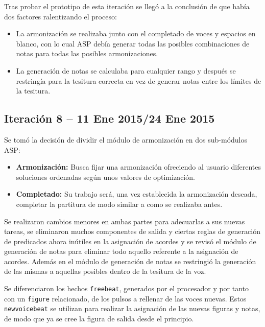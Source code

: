 Tras probar el prototipo de esta iteración se llegó a la conclusión de que había dos factores ralentizando el proceso:
\begin{itemize}
	\item La armonización se realizaba junto con el completado de voces y espacios en blanco, con lo cual ASP debía generar todas las posibles combinaciones de notas para todas las posibles armonizaciones.
	\item La generación de notas se calculaba para cualquier rango y después se restringía para la tesitura correcta en vez de generar notas entre los límites de la tesitura. 
\end{itemize}

\subsection{Iteración 8  -- 11 Ene 2015/24 Ene 2015}
\label{subsec:eighth_iteration}
Se tomó la decisión de dividir el módulo de armonización en dos sub-módulos ASP:
\begin{itemize}
	\item \textbf{Armonización:} Busca fijar una armonización ofreciendo al usuario diferentes soluciones ordenadas según unos valores de optimización.
	\item \textbf{Completado:} Su trabajo será, una vez establecida la armonización deseada, completar la partitura de modo similar a como se realizaba antes.
\end{itemize}

Se realizaron cambios menores en ambas partes para adecuarlas a sus nuevas tareas, se eliminaron muchos componentes de salida y ciertas reglas de generación de predicados ahora inútiles en la asignación de acordes y se revisó el módulo de generación de notas para eliminar todo aquello referente a la asignación de acordes. Además en el módulo de generación de notas se restringió la generación de las mismas a aquellas posibles dentro de la tesitura de la voz.

Se diferenciaron los hechos \texttt{freebeat}, generados por el procesador y por tanto con un \texttt{figure} relacionado, de los pulsos a rellenar de las voces nuevas. Estos \texttt{newvoicebeat} se utilizan para realizar la asignación de las nuevas figuras y notas, de modo que ya se cree la figura de salida desde el principio. 
	
